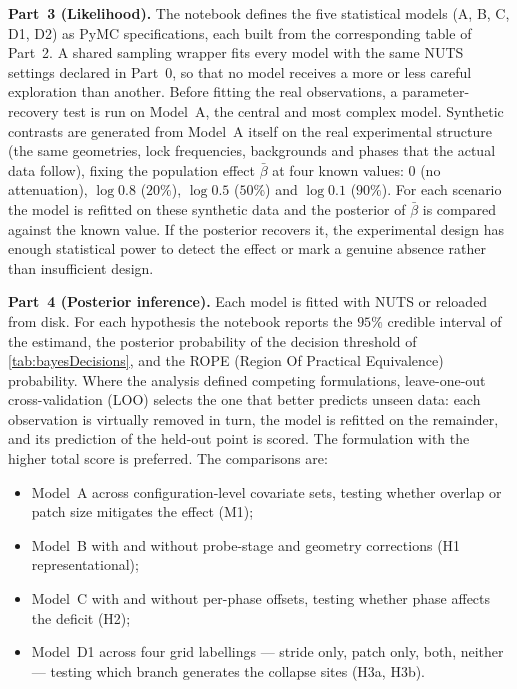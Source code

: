 \medskip
\textbf{Part~3 (Likelihood).} The notebook defines the five statistical models (A, B, C, D1, D2) as PyMC specifications, each built from the corresponding table of Part~2. A shared sampling wrapper fits every model with the same NUTS settings declared in Part~0, so that no model receives a more or less careful exploration than another. Before fitting the real observations, a parameter-recovery test is run on Model~A, the central and most complex model. Synthetic contrasts are generated from Model~A itself on the real experimental structure (the same geometries, lock frequencies, backgrounds and phases that the actual data follow), fixing the population effect $\bar\beta$ at four known values: $0$ (no attenuation), $\log 0.8$ ($20\%$), $\log 0.5$ ($50\%$) and $\log 0.1$ ($90\%$). For each scenario the model is refitted on these synthetic data and the posterior of $\bar\beta$ is compared against the known value. If the posterior recovers it, the experimental design has enough statistical power to detect the effect or mark a genuine absence rather than insufficient design.

\medskip
\textbf{Part~4 (Posterior inference).} Each model is fitted with NUTS or reloaded from disk. For each hypothesis the notebook reports the $95\%$ credible interval of the estimand, the posterior probability of the decision threshold of \autoref{tab:bayesDecisions}, and the ROPE (Region Of Practical Equivalence) probability. Where the analysis defined competing formulations, leave-one-out cross-validation (LOO) selects the one that better predicts unseen data: each observation is virtually removed in turn, the model is refitted on the remainder, and its prediction of the held-out point is scored. The formulation with the higher total score is preferred. The comparisons are:
\begin{itemize}\setlength{\itemsep}{2pt}
    \item Model~A across configuration-level covariate sets, testing whether overlap or patch size mitigates the effect (M1);
    \item Model~B with and without probe-stage and geometry corrections (H1 representational);
    \item Model~C with and without per-phase offsets, testing whether phase affects the deficit (H2);
    \item Model~D1 across four grid labellings --- stride only, patch only, both, neither --- testing which branch generates the collapse sites (H3a, H3b).
\end{itemize}

